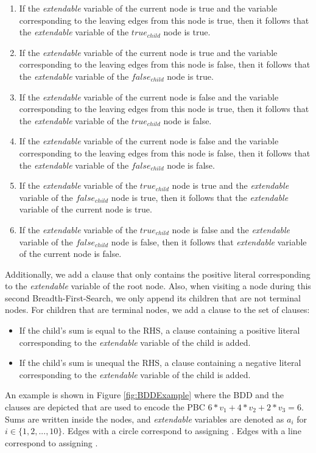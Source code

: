 \begin{enumerate}
    \item If the \emph{extendable} variable of the current node is true and the variable corresponding to the leaving edges from this node is true, then it follows that the \emph{extendable} variable of the $true_{child}$ node is true.
    \item If the \emph{extendable} variable of the current node is true and the variable corresponding to the leaving edges from this node is false, then it follows that the \emph{extendable} variable of the $false_{child}$ node is true.
    \item If the \emph{extendable} variable of the current node is false and the variable corresponding to the leaving edges from this node is true, then it follows that the \emph{extendable} variable of the $true_{child}$ node is false.
    \item If the \emph{extendable} variable of the current node is false and the variable corresponding to the leaving edges from this node is false, then it follows that the \emph{extendable} variable of the $false_{child}$ node is false.
    \item If the \emph{extendable} variable of the $true_{child}$ node is true and the \emph{extendable} variable of the $false_{child}$ node is true, then it follows that the \emph{extendable} variable of the current node is true.
    \item If the \emph{extendable} variable of the $true_{child}$ node is false and the \emph{extendable} variable of the $false_{child}$ node is false, then it follows that \emph{extendable} variable of the current node is false.
\end{enumerate}

Additionally, we add a clause that only contains the positive literal corresponding to the \emph{extendable} variable of the root node. Also, when visiting a node during this second Breadth-First-Search, we only append its children that are not terminal nodes. For children that are terminal nodes, we add a clause to the set of clauses: 
\begin{itemize}
    \item If the child's sum is equal to the RHS, a clause containing a positive literal corresponding to the \emph{extendable} variable of the child is added.
    \item If the child's sum is unequal the RHS, a clause containing a negative literal corresponding to the \emph{extendable} variable of the child is added.
\end{itemize}
An example is shown in Figure \ref{fig:BDDExample} where the BDD and the clauses are depicted that are used to encode the PBC $6*v_1+4*v_2+2*v_3=6$. Sums are written inside the nodes, and \emph{extendable} variables are denoted as $a_i$ for $i\in \{1,2,...,10\}$. Edges with a circle correspond to assigning \false{}. Edges with a line correspond to assigning \true{}.

